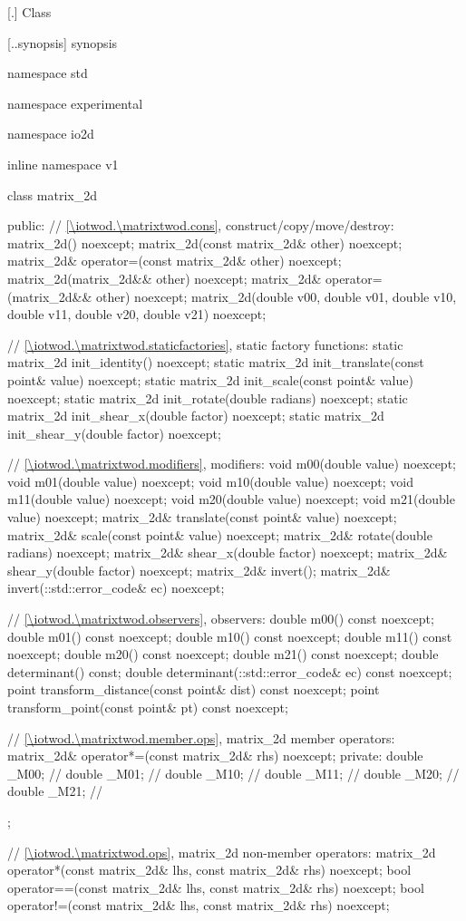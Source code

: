  [\iotwod.\matrixtwod] {Class }

 [\iotwod.\matrixtwod.synopsis] { synopsis}

\begin{codeblock}
namespace std { namespace experimental { namespace io2d { inline namespace v1 {
  class matrix_2d {
  public:
    // \ref{\iotwod.\matrixtwod.cons}, construct/copy/move/destroy:
    matrix_2d() noexcept;
    matrix_2d(const matrix_2d& other) noexcept;
    matrix_2d& operator=(const matrix_2d& other) noexcept;
    matrix_2d(matrix_2d&& other) noexcept;
    matrix_2d& operator=(matrix_2d&& other) noexcept;
    matrix_2d(double v00, double v01, double v10, double v11,
      double v20, double v21) noexcept;
    
    // \ref{\iotwod.\matrixtwod.staticfactories}, static factory functions:
    static matrix_2d init_identity() noexcept;
    static matrix_2d init_translate(const point& value) noexcept;
    static matrix_2d init_scale(const point& value) noexcept;
    static matrix_2d init_rotate(double radians) noexcept;
    static matrix_2d init_shear_x(double factor) noexcept;
    static matrix_2d init_shear_y(double factor) noexcept;
    
    // \ref{\iotwod.\matrixtwod.modifiers}, modifiers:
    void m00(double value) noexcept;
    void m01(double value) noexcept;
    void m10(double value) noexcept;
    void m11(double value) noexcept;
    void m20(double value) noexcept;
    void m21(double value) noexcept;
    matrix_2d& translate(const point& value) noexcept;
    matrix_2d& scale(const point& value) noexcept;
    matrix_2d& rotate(double radians) noexcept;
    matrix_2d& shear_x(double factor) noexcept;
    matrix_2d& shear_y(double factor) noexcept;
    matrix_2d& invert();
    matrix_2d& invert(::std::error_code& ec) noexcept;
    
    // \ref{\iotwod.\matrixtwod.observers}, observers:
    double m00() const noexcept;
    double m01() const noexcept;
    double m10() const noexcept;
    double m11() const noexcept;
    double m20() const noexcept;
    double m21() const noexcept;
    double determinant() const;
    double determinant(::std::error_code& ec) const noexcept;
    point transform_distance(const point& dist) const noexcept;
    point transform_point(const point& pt) const noexcept;
    
    // \ref{\iotwod.\matrixtwod.member.ops}, matrix_2d member operators:
    matrix_2d& operator*=(const matrix_2d& rhs) noexcept;
  private:
    double _M00; // \expos
    double _M01; // \expos
    double _M10; // \expos
    double _M11; // \expos
    double _M20; // \expos
    double _M21; // \expos
  };
    
  // \ref{\iotwod.\matrixtwod.ops}, matrix_2d non-member operators:
  matrix_2d operator*(const matrix_2d& lhs, const matrix_2d& rhs) noexcept;
  bool operator==(const matrix_2d& lhs, const matrix_2d& rhs) noexcept;
  bool operator!=(const matrix_2d& lhs, const matrix_2d& rhs) noexcept;
} } } }
\end{codeblock}


